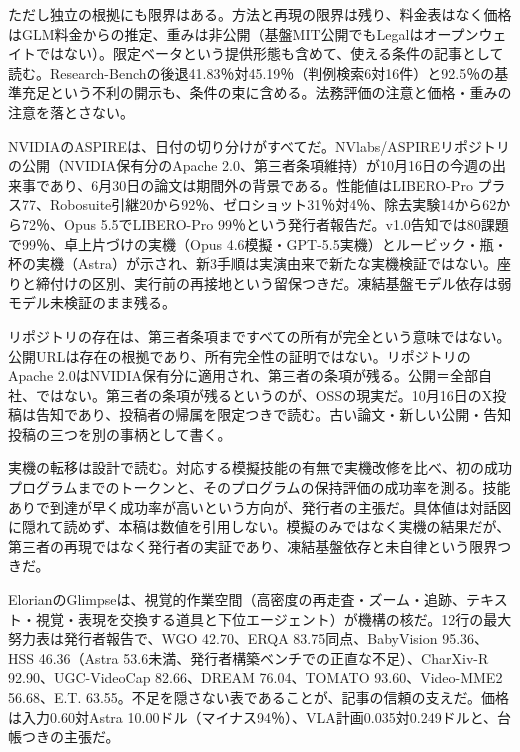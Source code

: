 \documentclass[lualatex,a4paper,10pt]{jlreq}
\begin{document}
ただし独立の根拠にも限界はある。方法と再現の限界は残り、料金表はなく価格はGLM料金からの推定、重みは非公開（基盤MIT公開でもLegalはオープンウェイトではない）。限定ベータという提供形態も含めて、使える条件の記事として読む。Research-Benchの後退41.83％対45.19％（判例検索6対16件）と92.5％の基準充足という不利の開示も、条件の束に含める。法務評価の注意と価格・重みの注意を落とさない。
\cite{B55,B53,B54}


NVIDIAのASPIREは、日付の切り分けがすべてだ。NVlabs/ASPIREリポジトリの公開（NVIDIA保有分のApache 2.0、第三者条項維持）が10月16日の今週の出来事であり、6月30日の論文は期間外の背景である。性能値はLIBERO-Pro プラス77、Robosuite引継20から92％、ゼロショット31％対4％、除去実験14から62から72％、Opus 5.5でLIBERO-Pro 99％という発行者報告だ。v1.0告知では80課題で99％、卓上片づけの実機（Opus 4.6模擬・GPT-5.5実機）とルービック・瓶・杯の実機（Astra）が示され、新3手順は実演由来で新たな実機検証ではない。座りと締付けの区別、実行前の再接地という留保つきだ。凍結基盤モデル依存は弱モデル未検証のまま残る。
\cite{B57,B56,B89}


リポジトリの存在は、第三者条項まですべての所有が完全という意味ではない。公開URLは存在の根拠であり、所有完全性の証明ではない。リポジトリのApache 2.0はNVIDIA保有分に適用され、第三者の条項が残る。公開＝全部自社、ではない。第三者の条項が残るというのが、OSSの現実だ。10月16日のX投稿は告知であり、投稿者の帰属を限定つきで読む。古い論文・新しい公開・告知投稿の三つを別の事柄として書く。
\cite{B57,B56}


実機の転移は設計で読む。対応する模擬技能の有無で実機改修を比べ、初の成功プログラムまでのトークンと、そのプログラムの保持評価の成功率を測る。技能ありで到達が早く成功率が高いという方向が、発行者の主張だ。具体値は対話図に隠れて読めず、本稿は数値を引用しない。模擬のみではなく実機の結果だが、第三者の再現ではなく発行者の実証であり、凍結基盤依存と未自律という限界つきだ。
\cite{B57,B56,B89}


ElorianのGlimpseは、視覚的作業空間（高密度の再走査・ズーム・追跡、テキスト・視覚・表現を交換する道具と下位エージェント）が機構の核だ。12行の最大努力表は発行者報告で、WGO 42.70、ERQA 83.75同点、BabyVision 95.36、HSS 46.36（Astra 53.6未満、発行者構築ベンチでの正直な不足）、CharXiv-R 92.90、UGC-VideoCap 82.66、DREAM 76.04、TOMATO 93.60、Video-MME2 56.68、E.T. 63.55。不足を隠さない表であることが、記事の信頼の支えだ。価格は入力0.60対Astra 10.00ドル（マイナス94％）、VLA計画0.035対0.249ドルと、台帳つきの主張だ。
\cite{B58,B59,B88}
\end{document}
